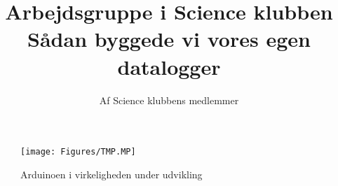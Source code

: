\title{
    Arbejdsgruppe i Science klubben\\ 
    Sådan byggede vi vores egen datalogger\\
}

\author{Af Science klubbens medlemmer}
\maketitle

\begin{figure}[!h]
	\centering
	\texttt{[image: Figures/TMP.MP]}
	\caption{Arduinoen i virkeligheden under udvikling}
\end{figure}

\thispagestyle{empty}
